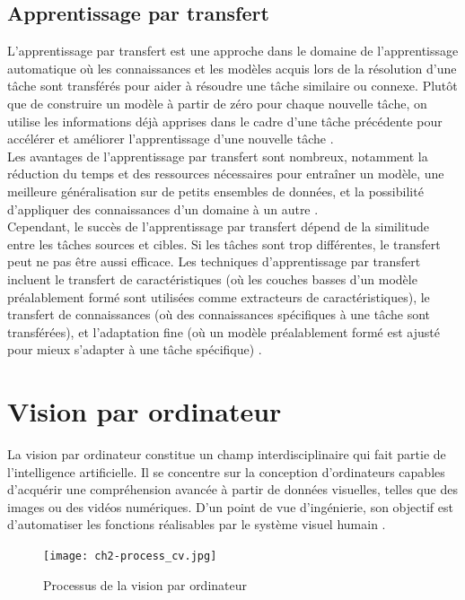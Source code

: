 \subsection{Apprentissage par transfert}

L'apprentissage par transfert est une approche dans le domaine de l'apprentissage automatique où les connaissances et les modèles acquis lors de la résolution d'une tâche sont transférés pour aider à résoudre une tâche similaire ou connexe. Plutôt que de construire un modèle à partir de zéro pour chaque nouvelle tâche, on utilise les informations déjà apprises dans le cadre d'une tâche précédente pour accélérer et améliorer l'apprentissage d'une nouvelle tâche \cite{Transfer_Transfer32}.\\
Les avantages de l'apprentissage par transfert sont nombreux, notamment la réduction du temps et des ressources nécessaires pour entraîner un modèle, une meilleure généralisation sur de petits ensembles de données, et la possibilité d'appliquer des connaissances d'un domaine à un autre \cite{Transfer_WhatIsTr80}.\\
Cependant, le succès de l'apprentissage par transfert dépend de la similitude entre les tâches sources et cibles. Si les tâches sont trop différentes, le transfert peut ne pas être aussi efficace. Les techniques d'apprentissage par transfert incluent le transfert de caractéristiques (où les couches basses d'un modèle préalablement formé sont utilisées comme extracteurs de caractéristiques), le transfert de connaissances (où des connaissances spécifiques à une tâche sont transférées), et l'adaptation fine (où un modèle préalablement formé est ajusté pour mieux s'adapter à une tâche spécifique) \cite{Transfer_Transfer45}.

\section{ Vision par ordinateur}

La vision par ordinateur constitue un champ interdisciplinaire qui fait partie de l'intelligence artificielle. Il se concentre sur la conception d'ordinateurs capables d'acquérir une compréhension avancée à partir de données visuelles, telles que des images ou des vidéos numériques. D'un point de vue d'ingénierie, son objectif est d'automatiser les fonctions réalisables par le système visuel humain \cite{Vision_par_ordinateur_Computer61}. 

\begin{figure}[H]
	\centering
	\texttt{[image: ch2-process\_cv.jpg]}
	\caption{Processus de la vision par ordinateur}
    \label{ch2-process_cv}
\end{figure}

